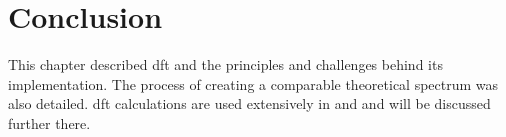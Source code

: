 \section{Conclusion}
This chapter described \acrshort{dft} and the principles and challenges behind its implementation. The process of creating a comparable theoretical spectrum was also detailed. \acrshort{dft} calculations are used extensively in  and  and will be discussed further there.